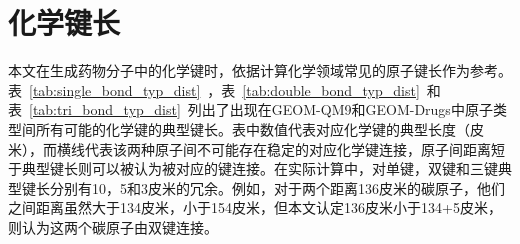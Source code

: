 {%

\section{化学键长}
本文在生成药物分子中的化学键时，依据计算化学领域常见的原子键长作为参考。表~\ref{tab:single_bond_typ_dist}~，表~\ref{tab:double_bond_typ_dist}~和表~\ref{tab:tri_bond_typ_dist}~列出了出现在GEOM-QM9和GEOM-Drugs中原子类型间所有可能的化学键的典型键长。表中数值代表对应化学键的典型长度（皮米），而横线代表该两种原子间不可能存在稳定的对应化学键连接，原子间距离短于典型键长则可以被认为被对应的键连接。在实际计算中，对单键，双键和三键典型键长分别有10，5和3皮米的冗余。例如，对于两个距离136皮米的碳原子，他们之间距离虽然大于134皮米，小于154皮米，但本文认定136皮米小于134+5皮米，则认为这两个碳原子由双键连接。

}
